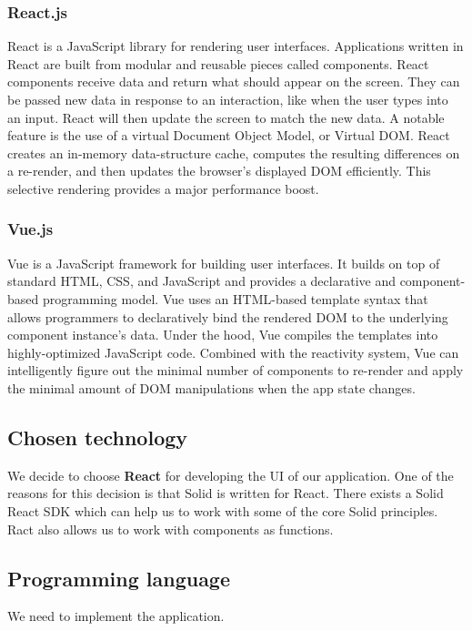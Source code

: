   \subsubsection*{React.js}
  React is a JavaScript library for rendering user interfaces.
  Applications written in React are built from modular and reusable pieces called components.
  React components receive data and return what should appear on the screen. 
  They can be passed new data in response to an interaction, like when the user types into an input. 
  React will then update the screen to match the new data.
  A notable feature is the use of a virtual Document Object Model, or Virtual DOM. 
  React creates an in-memory data-structure cache, computes the resulting differences on a re-render, and then updates the browser's displayed DOM efficiently. 
  This selective rendering provides a major performance boost.

  \subsubsection*{Vue.js}
  Vue is a JavaScript framework for building user interfaces. 
  It builds on top of standard HTML, CSS, and JavaScript and provides a declarative and component-based programming model.
  Vue uses an HTML-based template syntax that allows programmers to declaratively bind the rendered DOM to the underlying component instance's data.
  Under the hood, Vue compiles the templates into highly-optimized JavaScript code. 
  Combined with the reactivity system, Vue can intelligently figure out the minimal number of components to re-render and apply the minimal amount of DOM manipulations when the app state changes.

  \subsection*{Chosen technology}
  We decide to choose \textbf{React} for developing the UI of our application.
  One of the reasons for this decision is that Solid is written for React.
  There exists a Solid React SDK which can help us to work with some of the core Solid principles.
  Ract also allows us to work with components as functions.

\subsection{Programming language}
  We need to implement the application.

